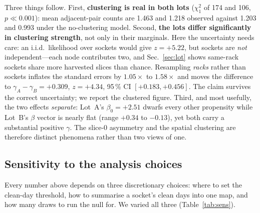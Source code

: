 \documentclass[10pt,conference]{IEEEtran}
\begin{document}
Three things follow. First, \textbf{clustering is real in both lots} ($\chi^2_1$ of 174 and 106,
$p\ll0.001$): mean adjacent-pair counts are 1.463 and 1.218 observed against 1.203 and 0.993 under
the no-clustering model. Second, \textbf{the lots differ significantly in clustering strength}, not only in their
marginals. Here the uncertainty needs care: an i.i.d.\ likelihood over sockets would give
$z=+5.22$, but sockets are \emph{not} independent---each node contributes two, and
Sec.~\ref{sec:lot} shows same-rack sockets share more harvested slices than chance. Resampling
\emph{racks} rather than sockets inflates the standard errors by $1.05\times$ to $1.58\times$ and
moves the difference to $\gamma_A-\gamma_B = +0.309$, $z=+4.34$, 95\,\% CI
$[+0.183,+0.456]$. The claim survives the correct uncertainty; we report the clustered figure. Third, and most usefully, the two effects
\emph{separate}: Lot~A's $\beta_0=+2.51$ dwarfs every other propensity while Lot~B's $\beta$ vector
is nearly flat (range $+0.34$ to $-0.13$), yet both carry a substantial positive $\gamma$. The
slice-0 asymmetry and the spatial clustering are therefore distinct phenomena rather than two
views of one.

\subsection{Sensitivity to the analysis choices}
\label{sec:sens}
Every number above depends on three discretionary choices: where to set the clean-day threshold,
how to summarise a socket's clean days into one map, and how many draws to run the null for. We
varied all three (Table~\ref{tab:sens}).
\end{document}
